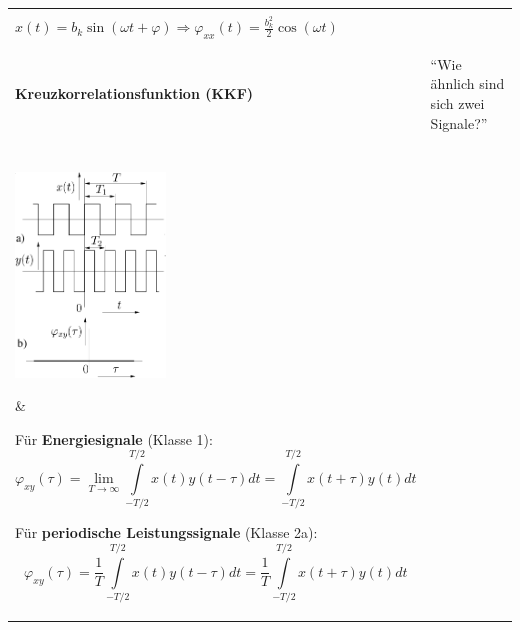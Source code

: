 \begin{tabular}{ll}
{	Für \textbf{nichtperiodische, stochastische Leistungssignale} (Klasse 2b):
	$$\varphi_{xx}(\tau) = \lim_{T\rightarrow\infty} \frac {1} {T}
	\int\limits_{-T/2}^{T/2} x(t)x(t-\tau)dt=\lim_{T\rightarrow\infty}\frac {1}
	{T} \int\limits_{-T/2}^{T/2} x(t+\tau)x(t)dt = \varphi_{xx}(-\tau)$$
	
	\textbf{Eigenschaften}
	\begin{itemize}
     \item $\varphi_{xx}(0) = X^2$ (Hat immer Diracstoss bei $\tau = 0$)
     \item $\varphi_{xx}(\tau)=\varphi_{xx}(\tau\pm mT)$, d.h. die
     AKF\index{Autokorrelationsfunktion} ist periodisch mit der gleichen Periode
     $T$ wie das Signal $x(t)$.
	\item $\varphi_{xx}(\tau)=\varphi_{xx}(-\tau)$: d.h. die AKF ist eine {\bf
	gerade Funktion}
	\item $\varphi_{xx}(0)\geq|\varphi_{xx}(\tau)|\quad$
	\item $\varphi_{xx}(\tau)\geq (X_0)^2-\sigma^2\quad$
   \end{itemize}
   
   $x(t) = a_k \cos(\omega t + \varphi) \Rightarrow \varphi_{xx}(t) =
   \frac{a_k^2}{2} \cos(\omega t)$\\
   $x(t) = b_k \sin(\omega t + \varphi) \Rightarrow \varphi_{xx}(t) =
   \frac{b_k^2}{2} \cos(\omega t)$\\ } \\
\hline & \\
\textbf{Kreuzkorrelationsfunktion (KKF)}
	& ``Wie ähnlich sind sich zwei Signale?'' \matlab{xcorr}\\
\parbox{6cm}{
 	 \\
	\includegraphics[width=4cm]{./bilder/kkf.png}
	}
	& \parbox{12cm}{
	Für \textbf{Energiesignale} (Klasse 1):
	$$\varphi_{xy}(\tau) = \lim_{T\rightarrow\infty}\int\limits_{-T/2}^{T/2}
	x(t)y(t-\tau)dt =\int\limits_{-T/2}^{T/2} x(t+\tau)y(t)dt$$ 

	Für \textbf{periodische Leistungssignale} (Klasse 2a):
	$$\varphi_{xy}(\tau) = \frac {1} {T} \int\limits_{-T/2}^{T/2}  x(t)y(t-\tau)dt
	= \frac {1} {T} \int\limits_{-T/2}^{T/2}  x(t+\tau)y(t)dt$$ 
		
}
\end{tabular}

